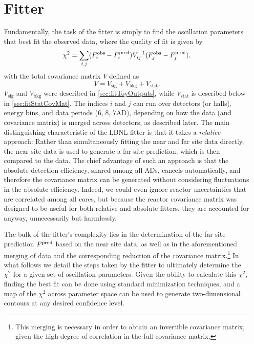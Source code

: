 \documentclass[../thesis.tex]{subfiles}
\begin{document}
\section{Fitter}
\label{sec:fitFitter}

Fundamentally, the task of the fitter is simply to find the oscillation parameters that best fit the observed data, where the quality of fit is given by
\begin{equation*}
  \chi^2 = \sum_{i,j} (F^{\mathrm{obs}}_i - F^{\mathrm{pred}}_i) V^{-1}_{ij} (F^{\mathrm{obs}}_j - F^{\mathrm{pred}}_j),
\end{equation*}
with the total covariance matrix $V$ defined as
\begin{equation*}
  V = V_{\mathrm{sig}} + V_{\mathrm{bkg}} + V_{\mathrm{stat}}.
\end{equation*}
$V_{\mathrm{sig}}$ and $V_{\mathrm{bkg}}$ were described in \autoref{sec:fitToyOutputs}, while $V_{\mathrm{stat}}$ is described below in \autoref{sec:fitStatCovMat}. The indices $i$ and $j$ can run over detectors (or halls), energy bins, and data periods (6, 8, 7AD), depending on how the data (and covariance matrix) is merged across detectors, as described later. The main distinguishing characteristic of the LBNL fitter is that it takes a \emph{relative} approach: Rather than simultaneously fitting the near and far site data directly, the near site data is used to generate a far site prediction, which is then compared to the data. The chief advantage of such an approach is that the absolute detection efficiency, shared among all ADs, cancels automatically, and therefore the covariance matrix can be generated without considering fluctuations in the absolute efficiency. Indeed, we could even ignore reactor uncertainties that are correlated among all cores, but because the reactor covariance matrix was designed to be useful for both relative and absolute fitters, they are accounted for anyway, unnecessarily but harmlessly.

The bulk of the fitter's complexity lies in the determination of the far site prediction $F^{\mathrm{pred}}$ based on the near site data, as well as in the aforementioned merging of data and the corresponding reduction of the covariance matrix.\footnote{This merging is necessary in order to obtain an invertible covariance matrix, given the high degree of correlation in the full covariance matrix.} In what follows we detail the steps taken by the fitter to ultimately determine the $\chi^2$ for a given set of oscillation parameters. Given the ability to calculate this $\chi^2$, finding the best fit can be done using standard minimization techniques, and a map of the $\chi^2$ across parameter space can be used to generate two-dimensional contours at any desired confidence level.
\end{document}
